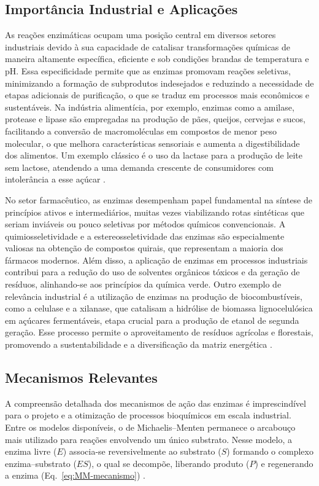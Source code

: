 \documentclass[12pt,oneside]{report}
\begin{document}
\subsection{Importância Industrial e Aplicações}

As reações enzimáticas ocupam uma posição central em diversos setores industriais devido à sua capacidade de catalisar transformações químicas de maneira altamente específica, eficiente e sob condições brandas de temperatura e pH. Essa especificidade permite que as enzimas promovam reações seletivas, minimizando a formação de subprodutos indesejados e reduzindo a necessidade de etapas adicionais de purificação, o que se traduz em processos mais econômicos e sustentáveis. Na indústria alimentícia, por exemplo, enzimas como a amilase, protease e lipase são empregadas na produção de pães, queijos, cervejas e sucos, facilitando a conversão de macromoléculas em compostos de menor peso molecular, o que melhora características sensoriais e aumenta a digestibilidade dos alimentos. Um exemplo clássico é o uso da lactase para a produção de leite sem lactose, atendendo a uma demanda crescente de consumidores com intolerância a esse açúcar \cite{buchholz2016enzymes}.

No setor farmacêutico, as enzimas desempenham papel fundamental na síntese de princípios ativos e intermediários, muitas vezes viabilizando rotas sintéticas que seriam inviáveis ou pouco seletivas por métodos químicos convencionais. A quimiosseletividade e a estereosseletividade das enzimas são especialmente valiosas na obtenção de compostos quirais, que representam a maioria dos fármacos modernos. Além disso, a aplicação de enzimas em processos industriais contribui para a redução do uso de solventes orgânicos tóxicos e da geração de resíduos, alinhando-se aos princípios da química verde. Outro exemplo de relevância industrial é a utilização de enzimas na produção de biocombustíveis, como a celulase e a xilanase, que catalisam a hidrólise de biomassa lignocelulósica em açúcares fermentáveis, etapa crucial para a produção de etanol de segunda geração. Esse processo permite o aproveitamento de resíduos agrícolas e florestais, promovendo a sustentabilidade e a diversificação da matriz energética \cite{patel2007biocatalysis}.

\subsection{Mecanismos Relevantes}

A compreensão detalhada dos mecanismos de ação das enzimas é imprescindível para o projeto e a otimização de processos bioquímicos em escala industrial. Entre os modelos disponíveis, o de Michaelis--Menten permanece o arcabouço mais utilizado para reações envolvendo um único substrato. Nesse modelo, a enzima livre ($E$) associa-se reversivelmente ao substrato ($S$) formando o complexo enzima–substrato ($ES$), o qual se decompõe, liberando produto ($P$) e regenerando a enzima (Eq.~\ref{eq:MM-mecanismo}) \cite{bisswanger2017}.
\end{document}
